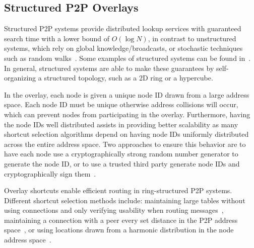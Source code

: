 \documentclass[letterpaper,twocolumn,10pt]{article}
\begin{document}
\subsection{Structured P2P Overlays}
Structured P2P systems provide distributed lookup services with guaranteed
search time with a lower bound of $O(\log N)$, in contrast to unstructured
systems, which rely on global knowledge/broadcasts, or stochastic techniques
such as random walks~\cite{unstructured_v_structured}.  Some examples of
structured systems can be found in~\cite{pastry, chord, symphony, kademlia,
can}.  In general, structured systems are able to make these guarantees by
self-organizing a structured topology, such as a 2D ring or a hypercube.

In the overlay, each node is given a unique node ID drawn from a large address
space.  Each node ID must be unique otherwise address collisions will occur,
which can prevent nodes from participating in the overlay.  Furthermore, having
the node IDs well distributed assists in providing better scalability as many
shortcut selection algorithms depend on having node IDs uniformly distributed
across the entire address space.  Two approaches to ensure this behavior are
to have each node use a cryptographically strong random number generator to
generate the node ID, or to use a trusted third party generate node IDs and
cryptographically sign them~\cite{secure_routing}.

%

Overlay shortcuts enable efficient routing in ring-structured P2P systems.
Different shortcut selection methods include: maintaining large tables without
using connections and only verifying usability when routing
messages~\cite{pastry, kademlia}, maintaining a connection with a peer every
set distance in the P2P address space~\cite{chord}, or using locations drawn
from a harmonic distribution in the node address space~\cite{symphony}.
\end{document}
